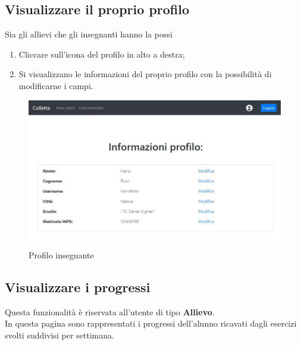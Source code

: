 \documentclass[11pt,a4paper]{article}
\begin{document}
{	\subsection{Visualizzare il proprio profilo}
	Sia gli allievi che gli insegnanti hanno la possi
	\begin{enumerate}
		\item Cliccare sull'icona del profilo in alto a destra;
		\item Si visualizzano le informazioni del proprio profilo con la possibilità di modificarne i campi.
	\end{enumerate}
\newpage
	\begin{figure}[h]
		\centering
		\includegraphics[scale=0.65]{images/profiloinsegnante.jpg}
		\caption{Profilo insegnante}
	\end{figure}
	
	
	\subsection{Visualizzare i progressi}
	Questa funzionalità è riservata all'utente di tipo \textbf{Allievo}.\\
	In questa pagina sono rappresentati i progressi dell'alunno ricavati dagli esercizi svolti suddivisi per settimana.
	
}
\end{document}
